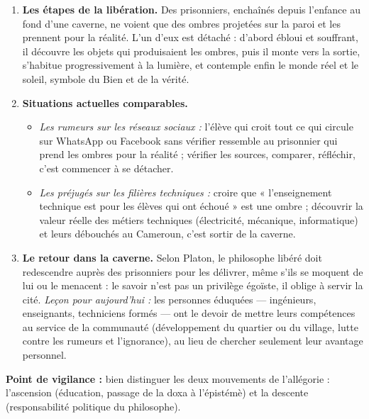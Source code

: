 \documentclass[11pt]{article}
\newcommand{\cle}[1]{{\popxbold\color{popdark}#1}}
\begin{document}
\begin{corrige}
\begin{enumerate}
\item \textbf{Les étapes de la libération.} Des prisonniers, enchaînés depuis l'enfance au fond d'une caverne, ne voient que des ombres projetées sur la paroi et les prennent pour la réalité. L'un d'eux est détaché : d'abord ébloui et souffrant, il découvre les objets qui produisaient les ombres, puis il monte vers la sortie, s'habitue progressivement à la lumière, et contemple enfin le monde réel et le soleil, symbole du Bien et de la vérité.
\item \textbf{Situations actuelles comparables.}
\begin{itemize}
\item \emph{Les rumeurs sur les réseaux sociaux :} l'élève qui croit tout ce qui circule sur WhatsApp ou Facebook sans vérifier ressemble au prisonnier qui prend les ombres pour la réalité ; vérifier les sources, comparer, réfléchir, c'est commencer à se détacher.
\item \emph{Les préjugés sur les filières techniques :} croire que « l'enseignement technique est pour les élèves qui ont échoué » est une ombre ; découvrir la valeur réelle des métiers techniques (électricité, mécanique, informatique) et leurs débouchés au Cameroun, c'est sortir de la caverne.
\end{itemize}
\item \textbf{Le retour dans la caverne.} Selon Platon, le philosophe libéré doit redescendre auprès des prisonniers pour les délivrer, même s'ils se moquent de lui ou le menacent : le savoir n'est pas un privilège égoïste, il oblige à servir la cité. \emph{Leçon pour aujourd'hui :} les personnes éduquées — ingénieurs, enseignants, techniciens formés — ont le devoir de mettre leurs compétences au service de la communauté (développement du quartier ou du village, lutte contre les rumeurs et l'ignorance), au lieu de chercher seulement leur avantage personnel.
\end{enumerate}
\textbf{Point de vigilance :} bien distinguer les deux mouvements de l'allégorie : l'ascension (éducation, passage de la \cle{doxa} à l'\cle{épistémè}) et la descente (responsabilité politique du philosophe).
\end{corrige}
\end{document}
